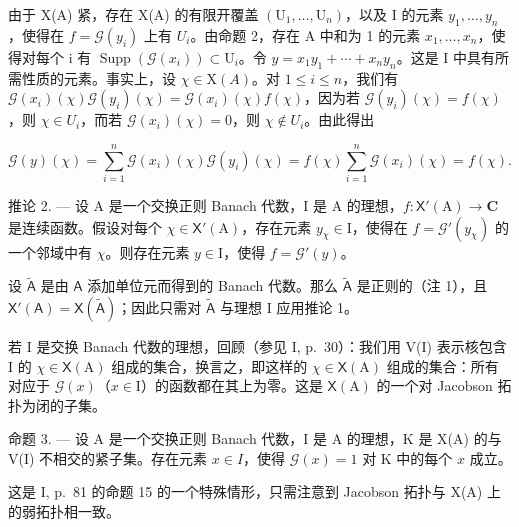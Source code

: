 由于 X(A) 紧，存在 X(A) 的有限开覆盖 \((\mathrm{U}_{1},\ldots,\mathrm{U}_{n})\)，以及 I 的元素 \(y_{1},\ldots,y_{n}\)，使得在 \(f=\mathcal{G}(y_{i})\) 上有 \(U_{i}\)。由命题 2，存在 A 中和为 1 的元素 \(x_{1},\ldots,x_{n}\)，使得对每个 i 有 \(\operatorname{Supp}(\mathcal{G}(x_{i}))\subset\mathrm{U}_{i}\)。令 \(y=x_{1}y_{1}+\cdots+x_{n}y_{n}\)。这是 I 中具有所需性质的元素。事实上，设 \(\chi\in\mathrm{X}(A)\)。对 \(1\leqslant i\leqslant n\)，我们有 \(\mathcal{G}(x_{i})(\chi)\mathcal{G}(y_{i})(\chi)=\mathcal{G}(x_{i})(\chi)f(\chi)\)，因为若 \(\mathcal{G}(y_{i})(\chi)=f(\chi)\)，则 \(\chi\in U_{i}\)，而若 \(\mathcal{G}(x_{i})(\chi)=0\)，则 \(\chi\notin U_{i}\)。由此得出

\[
\mathcal {G} (y) (\chi) = \sum_ {i = 1} ^ {n} \mathcal {G} (x _ {i}) (\chi) \mathcal {G} (y _ {i}) (\chi) = f (\chi) \sum_ {i = 1} ^ {n} \mathcal {G} (x _ {i}) (\chi) = f (\chi).
\]

推论 2. --- 设 A 是一个交换正则 Banach 代数，I 是 A 的理想，\(f\colon\mathsf{X}'(\mathrm{A})\to\mathbf{C}\) 是连续函数。假设对每个 \(\chi\in\mathsf{X}'(\mathrm{A})\)，存在元素 \(y_{\chi}\in\mathrm{I}\)，使得在 \(f=\mathcal{G}'(y_{\chi})\) 的一个邻域中有 \(\chi\)。则存在元素 \(y\in\mathrm{I}\)，使得 \(f=\mathcal{G}'(y)\)。

设 \(\tilde{\mathsf{A}}\) 是由 \(\mathsf{A}\) 添加单位元而得到的 Banach 代数。那么 \(\tilde{\mathsf{A}}\) 是正则的（注 1），且 \(\mathsf{X}'(\mathsf{A}) = \mathsf{X}(\widetilde{\mathsf{A}})\)；因此只需对 \(\tilde{\mathsf{A}}\) 与理想 I 应用推论 1。

若 I 是交换 Banach 代数的理想，回顾（参见 I, p.~30）：我们用 V(I) 表示核包含 I 的 \(\chi \in \mathsf{X}(\mathrm{A})\) 组成的集合，换言之，即这样的 \(\chi \in \mathsf{X}(\mathrm{A})\) 组成的集合：所有对应于 \(\mathcal{G}(x)\)（\(x \in \mathrm{I}\)）的函数都在其上为零。这是 \(\mathsf{X}(\mathrm{A})\) 的一个对 Jacobson 拓扑为闭的子集。

命题 3. --- 设 A 是一个交换正则 Banach 代数，I 是 A 的理想，K 是 X(A) 的与 V(I) 不相交的紧子集。存在元素 \(x \in I\)，使得 \(\mathcal{G}(x) = 1\) 对 K 中的每个 \(x\) 成立。

这是 I, p.~81 的命题 15 的一个特殊情形，只需注意到 Jacobson 拓扑与 X(A) 上的弱拓扑相一致。
